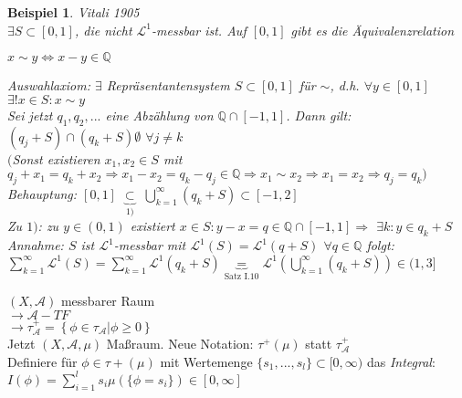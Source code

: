 \documentclass[11pt]{memoir}
\theoremstyle{changebreak}
\newtheorem{Beispiel}{Beispiel}[chapter]
\begin{document}
\begin{Beispiel}
\emph{Vitali 1905} \\
$\exists S \subset [0, 1]$, die nicht $\mathscr L^1$-messbar ist. Auf $[0, 1]$ gibt es die Äquivalenzrelation
\begin{center}
	$x \sim y \Leftrightarrow x - y \in \mathbb Q$
\end{center}
Auswahlaxiom: $\exists$ Repräsentantensystem $S \subset [0, 1]$ für $\sim$, d.h. $\forall y \in [0, 1]$ $\exists! x \in S: x \sim y$ \\
Sei jetzt $q_1, q_2, ...$ eine Abzählung von $\mathbb Q \cap [-1, 1]$. Dann gilt: $(q_j + S) \cap (q_k +S)  \emptyset $ $\forall j \ne k$ \\
$($Sonst existieren $x_1, x_2 \in S$ mit $q_j +x_1 = q_k + x_2 \Rightarrow x_1-x_2 = q_k -q_j \in \mathbb Q \Rightarrow x_1 \sim x_2  \Rightarrow x_1 = x_2 \Rightarrow q_j = q_k $\blitzd $ )$ \\

\emph{Behauptung:} $[0, 1]$ $\underbrace{\subset}_{1)}$ $\bigcup\limits_{k=1}^\infty
 (q_k + S) \subset [-1, 2]$ \\
 Zu $1)$: zu $y \in (0, 1)$ existiert $x \in S: y - x = q \in \mathbb Q \cap [-1, 1] \Rightarrow$ $\exists k: y \in q_k + S$ \\
\emph{Annahme:} $S$ ist $\mathscr L^1$-messbar mit $\mathscr L^1(S) = \mathscr L^1(q + S)$ $\forall q \in \mathbb Q$ folgt: $\sum\limits_{k=1}^\infty \mathscr L^1(S) = \sum\limits_{k=1}^\infty \mathscr L^1(q_k + S) \underbrace{=}_ {\text{Satz I.10}} \mathscr L^1\left(\bigcup\limits_{k=1}^\infty (q_k + S) \right) \in (1, 3]$ \blitzd
\end{Beispiel}




%
$(X, \mathscr A)$ messbarer Raum \\
$\rightarrow \mathscr A-TF$ \\
$\rightarrow \tau_\mathscr A ^+ = \left\{\phi \in \tau_\mathscr A | \phi \geq 0\right\}$ \\
Jetzt $(X, \mathscr A, \mu)$ Maßraum. Neue Notation: \underline{$\tau^+ (\mu)$} statt $\tau_\mathscr A ^+$ \\
Definiere für $\phi \in \tau+(\mu)$ mit Wertemenge $\{s_1, ... , s_l\} \subset [0, \infty)$ das \emph{Integral}: \\
$I(\phi) = \sum\limits_{i=1}^l s_i \mu(\{\phi = s_i\}) \in [0, \infty]$
\end{document}
